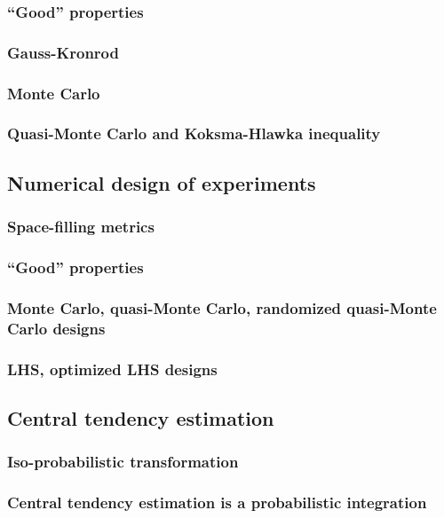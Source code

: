             \subsubsection{``Good'' properties}
            \subsubsection{Gauss-Kronrod}
            \subsubsection{Monte Carlo}
            \subsubsection{Quasi-Monte Carlo and Koksma-Hlawka inequality}
        \subsection{Numerical design of experiments}
            \subsubsection{Space-filling metrics}
            \subsubsection{``Good'' properties}
            \subsubsection{Monte Carlo, quasi-Monte Carlo, randomized quasi-Monte Carlo designs}
            \subsubsection{LHS, optimized LHS designs}
        \subsection{Central tendency estimation}
            \subsubsection{Iso-probabilistic transformation}
            \subsubsection{Central tendency estimation is a probabilistic integration}
